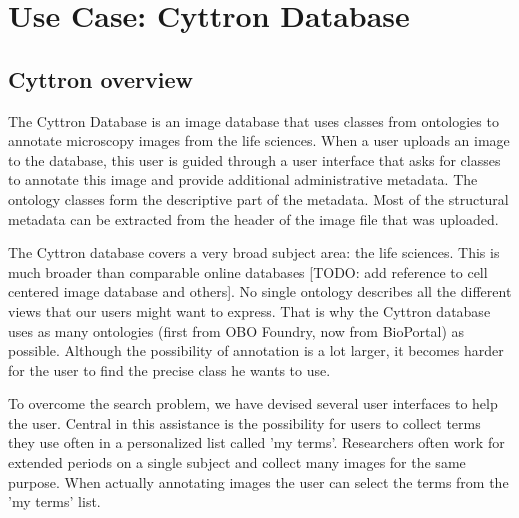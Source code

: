 
\chapter{Use Case: Cyttron Database} %

\label{Chapter4} %



\section{Cyttron overview}
The Cyttron Database is an image
database that uses classes from ontologies to annotate microscopy
images from the life sciences. When a user uploads an image to the
database, this user is guided through a user interface that asks for
classes to annotate this image and provide additional administrative
metadata. The ontology classes form the descriptive part of the
metadata. Most of the structural metadata can be extracted from the
header of the image file that was uploaded.

The Cyttron database covers a very broad subject area: the life
sciences. This is much broader than comparable online databases [TODO:
  add reference to cell centered image database and others]. No single
ontology describes all the different views that our users might want
to express. That is why the Cyttron database uses as many ontologies
(first from OBO Foundry, now from BioPortal) as possible. Although the
possibility of annotation is a lot larger, it becomes harder for the
user to find the precise class he wants to use.

To overcome the search problem, we have devised several user
interfaces to help the user. Central in this assistance is the
possibility for users to collect terms they use often in a
personalized list called 'my terms'. Researchers often work for
extended periods on a single subject and collect many images for the
same purpose. When actually annotating images the user can select the
terms from the 'my terms' list.

